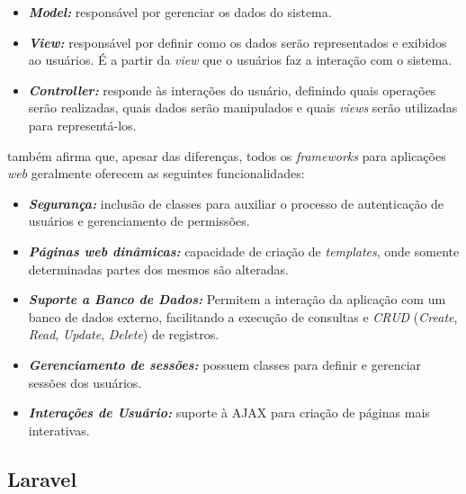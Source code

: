 \documentclass[
  12pt,       %
  openright,      %
  oneside,      %
  a4paper,      %
  english,      %
  french,        %
  spanish,     %
  brazil        %
  ]{abntex2-decsi}
\begin{document}
            \begin{itemize}
              \item \textbf{\textit{Model:}} responsável por gerenciar os dados do sistema.
              \item \textbf{\textit{View:}} responsável por definir como os dados serão representados e exibidos ao usuários. É a partir da \textit{view} que o usuários faz a interação com o sistema.
              \item \textbf{\textit{Controller:}} responde às interações do usuário, definindo quais operações serão realizadas, quais dados serão manipulados e quais \textit{views} serão utilizadas para representá-los.
            \end{itemize}

             também afirma que, apesar das diferenças, todos os \textit{frameworks} para aplicações \textit{web} geralmente oferecem as seguintes funcionalidades:

            \begin{itemize}
                \item \textbf{\textit{Segurança:}} inclusão de classes para auxiliar o processo de autenticação de usuários e gerenciamento de permissões.
                \item \textbf{\textit{Páginas web dinâmicas:}} capacidade de criação de \textit{templates}, onde somente determinadas partes dos mesmos são alteradas.
                \item \textbf{\textit{Suporte a Banco de Dados:}} Permitem a interação da aplicação com um banco de dados externo, facilitando a execução de consultas e \textit{CRUD} (\textit{Create}, \textit{Read}, \textit{Update}, \textit{Delete}) de registros.
                \item \textbf{\textit{Gerenciamento de sessões:}} possuem classes para definir e gerenciar sessões dos usuários.
                \item \textbf{\textit{Interações de Usuário:}} suporte à AJAX para criação de páginas mais interativas.
            \end{itemize}

        \subsection{Laravel} 
\end{document}

